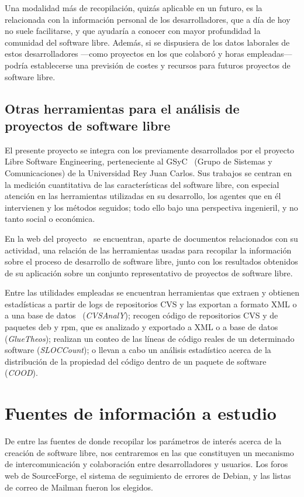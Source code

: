 Una modalidad más de recopilación, quizás aplicable en un futuro, es la
relacionada con la información personal de los desarrolladores,
que a día de hoy no suele facilitarse, y que ayudaría
a conocer con mayor profundidad la comunidad del software libre. Además, si
se dispusiera de los datos laborales de estos desarrolladores ---como proyectos
en los que colaboró y horas empleadas--- podría establecerse una previsión
de costes y recursos para futuros proyectos de software libre.


\subsection{Otras herramientas para el análisis de proyectos de software libre}
El presente proyecto se integra con los previamente desarrollados por el
proyecto Libre Software Engineering, perteneciente al GSyC~\cite{GSYC}
(Grupo de Sistemas y Comunicaciones) de la Universidad Rey Juan Carlos.
Sus trabajos se centran en la medición cuantitativa de las características
del software libre, con especial atención en las herramientas utilizadas en
su desarrollo, los agentes que en él intervienen y los métodos seguidos;
todo ello bajo una perspectiva ingenieril, y no tanto social o económica.

En la web del proyecto~\cite{LSE} se encuentran,
aparte de documentos relacionados con su actividad, una relación de las
herramientas usadas para recopilar la información sobre el proceso de desarrollo
de software libre, junto con los resultados obtenidos de su aplicación sobre
un conjunto representativo de proyectos de software libre.

Entre las utilidades empleadas se encuentran herramientas que extraen
y obtienen estadísticas a partir de logs de repositorios CVS y las exportan
a formato XML o a una base de datos~\cite{CVSWWW, CVS} (\textit{CVSAnalY});
recogen código de repositorios CVS y de paquetes deb y rpm, que es analizado
y exportado a XML o a base de datos~\cite{GlueWWW, Glue} (\textit{GlueTheos});
realizan un conteo de las líneas de código reales de un determinado software
\cite{Sloc} (\textit{SLOCCount});
o llevan a cabo un análisis estadístico acerca de la distribución de la
propiedad del código dentro de un paquete de software~\cite{Codd} (\textit{COOD}).



\section{Fuentes de información a estudio}
De entre las fuentes de donde recopilar los parámetros de interés acerca de
la creación de software libre, nos centraremos en las que constituyen un
mecanismo de intercomunicación y colaboración entre desarrolladores y usuarios.
Los foros web de SourceForge, el sistema de seguimiento de errores de Debian,
y las listas de correo de Mailman fueron los elegidos.


